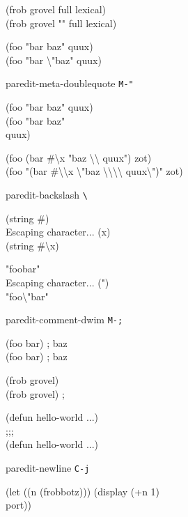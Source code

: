\documentclass[landscape,a4paper]{article}
\newenvironment{nstabbing}
  {\setlength{\topsep}{-\parskip}%
   \setlength{\partopsep}{0.2em}%
   \tabbing}
  {\endtabbing}
\begin{document}
\begin{multicols}{4}
\ttfamily
(frob grovel \cursor full lexical)\\
(frob grovel "\cursor " full lexical)

(foo "bar \cursor baz" quux)\\
(foo "bar \textbackslash"\cursor baz" quux)
\rmfamily

paredit-meta-doublequote \texttt{M-"}

\ttfamily
(foo "bar \cursor baz" quux)\\
(foo "bar baz"\\
\hspace*{3em}\cursor quux)

(foo \cursor(bar \#\textbackslash x "baz \textbackslash\textbackslash{} quux") zot)\\
(foo "\cursor(bar \#\textbackslash\textbackslash x \textbackslash"baz \textbackslash\textbackslash\textbackslash\textbackslash{} quux\textbackslash")" zot)
\rmfamily

paredit-backslash \texttt{\textbackslash}

\ttfamily
(string \#\cursor)\\
Escaping character... (x)\\
(string \#\textbackslash x\cursor)

"foo\cursor bar"\\
Escaping character... (")\\
"foo\textbackslash"\cursor bar"
\rmfamily

paredit-comment-dwim \texttt{M-;}

\ttfamily
\begin{nstabbing}
(foo \cursor bar) \space ; baz \space \space \space \space \=\\
(foo bar) \>; \cursor baz
\end{nstabbing}

\begin{nstabbing}
(frob grovel)\cursor \space \space \space \space \space \space \space \space\=\\
(frob grovel) \>;\cursor
\end{nstabbing}

\cursor(defun hello-world ...)\\
;;; \cursor\\
(defun hello-world ...)
\rmfamily

paredit-newline \texttt{C-j}

\ttfamily
\begin{nstabbing}
(let ((n (frobbotz))) \cursor (display (+n 1)\\
port))
\end{nstabbing}


\end{multicols}
\end{document}
